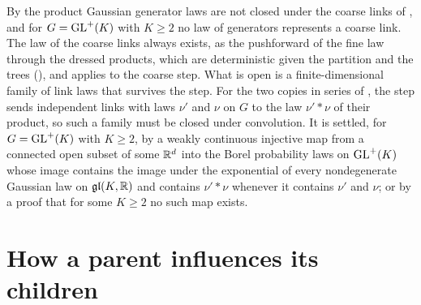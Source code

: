 By  the product Gaussian generator laws are not closed under the
coarse links of , and for \(G=\mathrm{GL}^+(K)\) with \(K\geq2\) no law of
generators represents a coarse link. The law of the coarse links always exists, as the pushforward of the
fine law through the dressed products, which are deterministic given the partition and the trees
(), and  applies to the coarse step. What
is open is a finite-dimensional family of link laws that survives the step. For the two copies in series of
, the step sends independent links with laws \(\nu'\) and \(\nu\) on
\(G\) to the law \(\nu'*\nu\) of their product, so such a family must be closed under convolution. It is
settled, for \(G=\mathrm{GL}^+(K)\) with \(K\geq2\), by a weakly continuous injective map from a connected open
subset of some \(\mathbb R^d\) into the Borel probability laws on \(\mathrm{GL}^+(K)\) whose image contains the image under
the exponential of every nondegenerate Gaussian law on \(\mathfrak{gl}(K,\mathbb R)\) and contains \(\nu'*\nu\)
whenever it contains \(\nu'\) and \(\nu\); or by a proof that for some \(K\geq2\) no such map exists.

\section{How a parent influences its children}
\label{sec:full-graph-vfe-downward}

